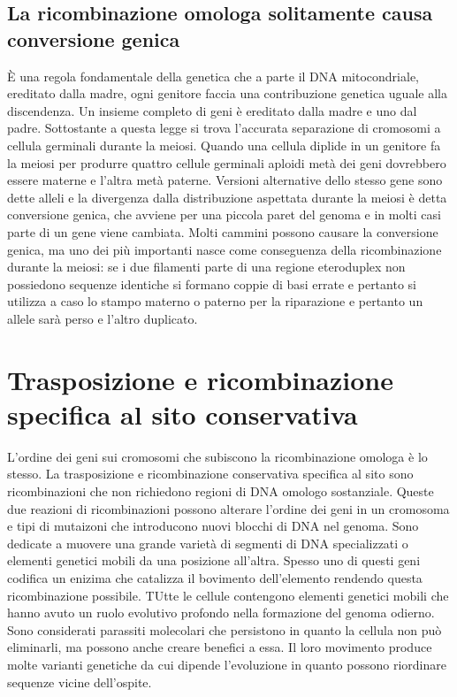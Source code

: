 \subsection{La ricombinazione omologa solitamente causa conversione genica}
\`E una regola fondamentale della genetica che a parte il DNA mitocondriale, ereditato dalla madre, ogni genitore faccia una contribuzione genetica uguale alla discendenza. Un insieme
completo di geni \`e ereditato dalla madre e uno dal padre. Sottostante a questa legge si trova l'accurata separazione di cromosomi a cellula germinali durante la meiosi. Quando una 
cellula diplide in un genitore fa la meiosi per produrre quattro cellule germinali aploidi met\`a dei geni dovrebbero essere materne e l'altra met\`a paterne. Versioni alternative dello
stesso gene sono dette alleli e la divergenza dalla distribuzione aspettata durante la meiosi \`e detta conversione genica, che avviene per una piccola paret del genoma e in molti casi
parte di un gene viene cambiata. Molti cammini possono causare la conversione genica, ma uno dei pi\`u importanti nasce come conseguenza della ricombinazione durante la meiosi: se i
due filamenti parte di una regione eteroduplex non possiedono sequenze identiche si formano coppie di basi errate e pertanto si utilizza a caso lo stampo materno o paterno per la 
riparazione e pertanto un allele sar\`a perso e l'altro duplicato. 
\section{Trasposizione e ricombinazione specifica al sito conservativa}
L'ordine dei geni sui cromosomi che subiscono la ricombinazione omologa \`e lo stesso. La trasposizione e ricombinazione conservativa specifica al sito sono ricombinazioni che non
richiedono regioni di DNA omologo sostanziale. Queste due reazioni di ricombinazioni possono alterare l'ordine dei geni in un cromosoma e tipi di mutaizoni che introducono nuovi blocchi
di DNA nel genoma. Sono dedicate a muovere una grande variet\`a di segmenti di DNA specializzati o elementi genetici mobili da una posizione all'altra. Spesso uno di questi geni codifica
un enizima che catalizza il bovimento dell'elemento rendendo questa ricombinazione possibile. TUtte le cellule contengono elementi genetici mobili che hanno avuto un ruolo evolutivo
profondo nella formazione del genoma odierno. Sono considerati parassiti molecolari che persistono in quanto la cellula non pu\`o eliminarli, ma possono anche creare benefici a essa. Il
loro movimento produce molte varianti genetiche da cui dipende l'evoluzione in quanto possono riordinare sequenze vicine dell'ospite. 
